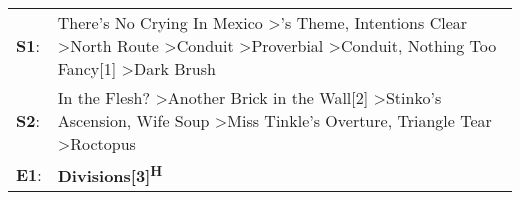\begin{supertabular}{p{0.03\textwidth}p{0.92\textwidth}}
 \textbf{S1}:  &  There's No Crying In Mexico\textsuperscript{} \textgreater {}'s Theme\textsuperscript{}, \enspace Intentions Clear\textsuperscript{} \textgreater \enspace North Route\textsuperscript{} \textgreater \enspace Conduit\textsuperscript{} \textgreater \enspace Proverbial\textsuperscript{} \textgreater \enspace Conduit\textsuperscript{}, \enspace Nothing Too Fancy[1]\textsuperscript{} \textgreater \enspace Dark Brush\textsuperscript{}  \enspace  \\
 \textbf{S2}:  &                                                                                           In the Flesh?\textsuperscript{} \textgreater \enspace Another Brick in the Wall[2]\textsuperscript{} \textgreater \enspace Stinko's Ascension\textsuperscript{}, \enspace Wife Soup\textsuperscript{} \textgreater \enspace Miss Tinkle's Overture\textsuperscript{}, \enspace Triangle Tear\textsuperscript{} \textgreater \enspace Roctopus\textsuperscript{}  \enspace  \\
 \textbf{E1}:  &                                                                                                                                                                                                                                                                                                                                                                                                                  \textbf{Divisions[3]\textsuperscript{H}}  \enspace  \\
\end{supertabular}

